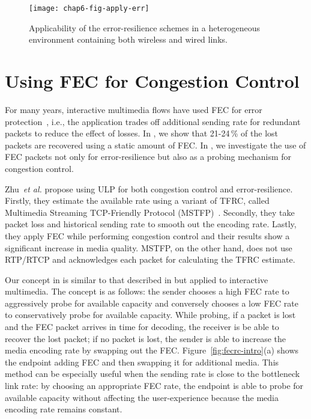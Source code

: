 \begin{figure}
\centerline {
\texttt{[image: chap6-fig-apply-err]}
}
\caption{Applicability of the error-resilience schemes in a heterogeneous
environment containing both wireless and wired links.}
\label{fig:apply_err}
\end{figure}


\section{Using FEC for Congestion Control}

For many years, interactive multimedia flows have used FEC for error 
protection~\cite{wang00review, wang98error}, i.e., the
application trades off additional sending rate for redundant packets to reduce
the effect of losses. In , we show that 21-24\,\% of the lost
packets are recovered using a static amount of FEC. In , we
investigate the use of FEC packets not only for error-resilience but also as a
probing mechanism for congestion control.

Zhu~\textit{et al.}\cite{Zhu:2001tu,springerlink:1022865704606} propose using
ULP for both congestion control and error-resilience. 
Firstly, they estimate the available rate using a variant of TFRC,
called Multimedia Streaming TCP-Friendly Protocol (MSTFP)~\cite{871542}.
Secondly, they take packet loss and historical sending rate to smooth out the
encoding rate. Lastly, they apply FEC while performing congestion control and
their results show a significant increase in media quality. MSTFP, on the other
hand, does not use RTP/RTCP and acknowledges each packet for calculating the
TFRC estimate.

Our concept in  is similar to that described in
\cite{Zhu:2001tu} but applied to interactive multimedia. The concept is as
follows: the sender chooses a high FEC rate to aggressively probe for
available capacity and conversely chooses a low FEC rate to conservatively
probe for available capacity. While probing, if a packet is lost and the FEC
packet arrives in time for decoding, the receiver is be able to recover the
lost packet; if no packet is lost, the sender is able to increase the media
encoding rate by swapping out the FEC. Figure~\ref{fig:fecrc-intro}(a) shows
the endpoint adding FEC and then swapping it for additional media. This method
can be especially useful when the sending rate is close to the bottleneck link
rate: by choosing an appropriate FEC rate, the endpoint is able to probe for
available capacity without affecting the user-experience because the media
encoding rate remains constant.

